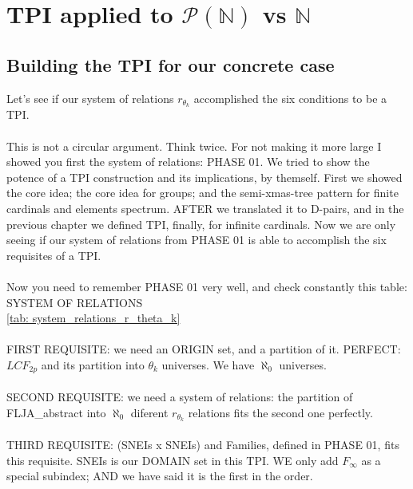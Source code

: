 \chapter{TPI applied to $\mathcal{P}(\mathbb{N})$ vs $\mathbb{N}$ }


	\section{Building the TPI for our concrete case}
	
		\noindent
		Let's see if our system of relations $r_{\theta_{k}}$ accomplished the six conditions to be a TPI.
		\\\\
		
		\noindent
		This is not a circular argument. Think twice. For not making it more large I showed you first the system of relations: PHASE 01. We tried to show the potence of a TPI construction and its implications, by themself. First we showed the core idea; the core idea for groups; and the semi-xmas-tree pattern for finite cardinals and elements spectrum. AFTER we translated it to D-pairs, and in the previous chapter we defined TPI, finally, for infinite cardinals. Now we are only seeing if our system of relations from PHASE 01 is able to accomplish the six requisites of a TPI.
		\\\\
		
		\noindent
		Now you need to remember PHASE 01 very well, and check constantly this table: SYSTEM OF RELATIONS\\
		\ref{tab: system_relations_r_theta_k}
		\\\\
		
		\noindent
		FIRST REQUISITE: we need an ORIGIN set, and a partition of it. PERFECT: $LCF_{2p}$ and its partition into $\theta_{k}$ universes. We have $\aleph_{0}$ universes.
		\\\\
		
		\noindent
		SECOND REQUISITE: we need a system of relations: the partition of FLJA\_abstract into $\aleph_{0}$ diferent $r_{\theta_{k}}$ relations fits the second one perfectly.
		\\\\
		
		\noindent
		THIRD REQUISITE: (SNEIs x SNEIs) and Families, defined in PHASE 01, fits this requisite. SNEIs is our DOMAIN set in this TPI. WE only add $F_{\infty}$ as a special subindex; AND we have said it is the first in the order.
		\\\\
		
